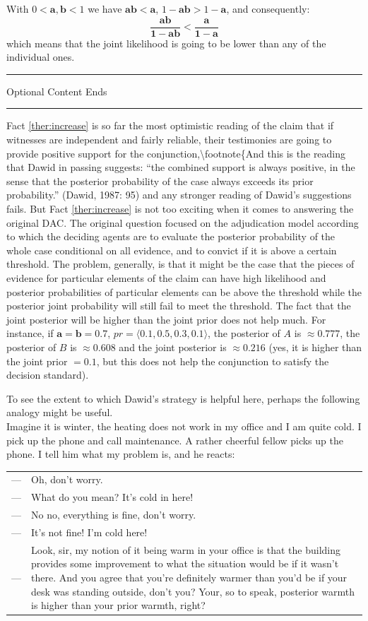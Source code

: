\documentclass[10pt,dvipsnames,enabledeprecatedfontcommands]{scrartcl}
\newcommand{\ra}{\rangle}
\newcommand{\la}{\langle}
\newcommand{\intermezzob}{\nopagebreak 
	\begin{minipage}[c]{13cm}
	\begin{center}\rule{10cm}{0.4pt}

	\tiny{\sc Optional Content Ends}
	
	\vspace{-1mm}
	
	\rule{10cm}{0.4pt}\end{center}
	\end{minipage}
	}
\begin{document}
With \(0<\mathbf{a},\mathbf{b}<1\) we have \(\mathbf{ab}<\mathbf{a}\),
\(1-\mathbf{ab}>1-\mathbf{a}\), and consequently:
\[\frac{\mathbf{ab}}{\mathbf{1-ab}} < \frac{\mathbf{a}}{\mathbf{1-a}}\]
which means that the joint likelihood is going to be lower than any of
the individual ones.

\intermezzob

Fact \ref{ther:increase} is so far the most optimistic reading of the
claim that if witnesses are independent and fairly reliable, their
testimonies are going to provide positive support for the
conjunction,\textbackslash{}footnote\{And this is the reading that Dawid
in passing suggests: ``the combined support is always positive, in the
sense that the posterior probability of the case always exceeds its
prior probability.'' (Dawid, 1987: 95) and any stronger reading of
Dawid's suggestions fails. But Fact \ref{ther:increase} is not too
exciting when it comes to answering the original DAC. The original
question focused on the adjudication model according to which the
deciding agents are to evaluate the posterior probability of the whole
case conditional on all evidence, and to convict if it is above a
certain threshold. The problem, generally, is that it might be the case
that the pieces of evidence for particular elements of the claim can
have high likelihood and posterior probabilities of particular elements
can be above the threshold while the posterior joint probability will
still fail to meet the threshold. The fact that the joint posterior will
be higher than the joint prior does not help much. For instance, if
\(\mathbf{a}=\mathbf{b}=0.7\), \(pr=\la 0.1, 0.5, 0.3, 0.1\ra\), the
posterior of \(A\) is \(\approx 0.777\), the posterior of \(B\) is
\(\approx 0.608\) and the joint posterior is \(\approx 0.216\) (yes, it
is higher than the joint prior \(=0.1\), but this does not help the
conjunction to satisfy the decision standard).

To see the extent to which Dawid's strategy is helpful here, perhaps the
following analogy might be useful.\\
Imagine it is winter, the heating does not work in my office and I am
quite cold. I pick up the phone and call maintenance. A rather cheerful
fellow picks up the phone. I tell him what my problem is, and he reacts:

\vspace{1mm}

\begin{tabular}{lp{10cm}}
 --- & Oh, don't worry. \\
 --- & What do you mean? It's cold in here! \\
 --- & No no, everything is fine, don't worry.\\
 --- & It's not fine! I'm cold here! \\
 --- & Look, sir, my notion of it being warm in your office is that the building provides some improvement to what the situation would be if it wasn't there. And you agree that you're definitely warmer than you'd be if your desk was standing outside, don't you? Your, so to speak, posterior warmth is higher than your prior warmth, right? 
 \end{tabular}
\end{document}
